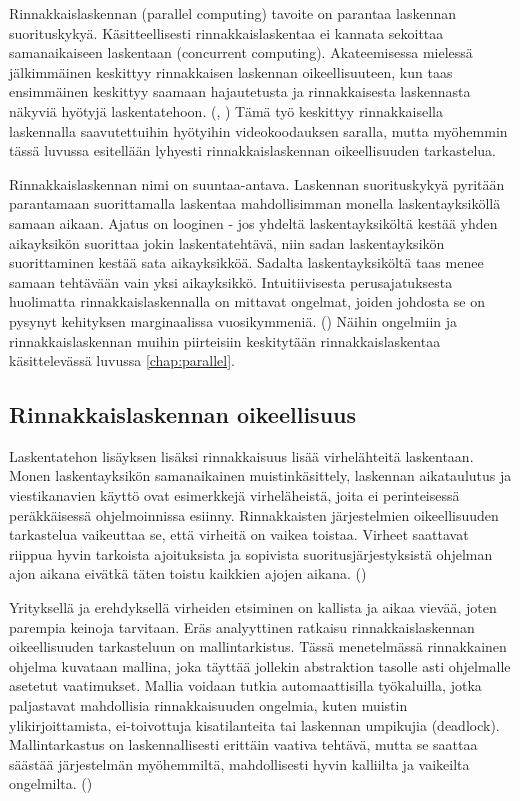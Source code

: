 Rinnakkaislaskennan (parallel computing) tavoite on parantaa laskennan
suorituskykyä. Käsitteellisesti rinnakkaislaskentaa ei kannata sekoittaa
samanaikaiseen laskentaan (concurrent computing). Akateemisessa mielessä
jälkimmäinen keskittyy rinnakkaisen laskennan oikeellisuuteen, kun taas
ensimmäinen keskittyy saamaan hajautetusta ja rinnakkaisesta laskennasta
näkyviä hyötyjä laskentatehoon. (\citealt{intro}, \citealt{ari}) Tämä työ keskittyy
rinnakkaisella laskennalla saavutettuihin hyötyihin videokoodauksen saralla,
mutta myöhemmin tässä luvussa esitellään lyhyesti rinnakkaislaskennan
oikeellisuuden tarkastelua.

Rinnakkaislaskennan nimi on suuntaa-antava. Laskennan suorituskykyä pyritään parantamaan
suorittamalla laskentaa mahdollisimman monella laskentayksiköllä samaan aikaan.
Ajatus on looginen - jos yhdeltä laskentayksiköltä kestää yhden aikayksikön
suorittaa jokin laskentatehtävä, niin sadan laskentayksikön suorittaminen
kestää sata aikayksikköä. Sadalta laskentayksiköltä taas menee samaan tehtävään
vain yksi aikayksikkö. Intuitiivisesta perusajatuksesta huolimatta
rinnakkaislaskennalla on mittavat ongelmat, joiden
johdosta se on pysynyt kehityksen marginaalissa vuosikymmeniä.
(\citealt{intro}) Näihin ongelmiin ja rinnakkaislaskennan muihin piirteisiin
keskitytään rinnakkaislaskentaa käsittelevässä luvussa \ref{chap:parallel}.

\subsection{Rinnakkaislaskennan oikeellisuus}
\label{sec:model}

Laskentatehon lisäyksen lisäksi rinnakkaisuus lisää virhelähteitä laskentaan.
Monen laskentayksikön samanaikainen muistinkäsittely, laskennan aikataulutus ja viestikanavien käyttö ovat
esimerkkejä virheläheistä, joita ei perinteisessä peräkkäisessä ohjelmoinnissa
esiinny. Rinnakkaisten järjestelmien oikeellisuuden tarkastelua vaikeuttaa se,
että virheitä on vaikea toistaa. Virheet saattavat riippua hyvin tarkoista
ajoituksista ja sopivista suoritusjärjestyksistä ohjelman ajon aikana eivätkä
täten toistu kaikkien ajojen aikana. (\citealt{ari})

Yrityksellä ja erehdyksellä virheiden etsiminen on kallista ja aikaa vievää,
joten parempia keinoja tarvitaan. Eräs analyyttinen ratkaisu
rinnakkaislaskennan oikeellisuuden tarkasteluun on mallintarkistus. Tässä
menetelmässä rinnakkainen ohjelma kuvataan mallina, joka täyttää jollekin
abstraktion tasolle asti ohjelmalle asetetut vaatimukset. Mallia voidaan
tutkia automaattisilla työkaluilla, jotka paljastavat mahdollisia
rinnakkaisuuden ongelmia, kuten muistin ylikirjoittamista, ei-toivottuja
kisatilanteita tai laskennan umpikujia (deadlock).
Mallintarkastus on laskennallisesti erittäin vaativa tehtävä, mutta se saattaa
säästää järjestelmän myöhemmiltä, mahdollisesti hyvin kalliilta ja vaikeilta
ongelmilta. (\citealt{ari})

